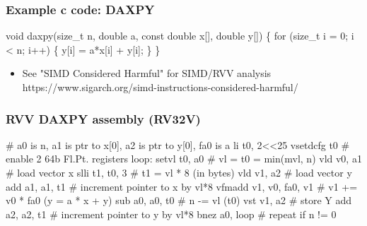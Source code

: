 \documentclass[slidestop]{beamer}
\begin{document}


\begin{frame}[fragile]
\frametitle{Example c code: DAXPY}

\begin{semiverbatim}
    void daxpy(size_t n, double a,
               const double x[], double y[])
    \{
     for (size_t i = 0; i < n; i++) \{
       y[i] = a*x[i] + y[i];
     \}
    \}
\end{semiverbatim}

  \begin{itemize}
   \item See "SIMD Considered Harmful" for SIMD/RVV analysis\\
	   https://www.sigarch.org/simd-instructions-considered-harmful/
  \end{itemize}


\end{frame}


\begin{frame}[fragile]
\frametitle{RVV DAXPY assembly (RV32V)}

\begin{semiverbatim}
# a0 is n, a1 is ptr to x[0], a2 is ptr to y[0], fa0 is a
 li t0, 2<<25
 vsetdcfg t0            # enable 2 64b Fl.Pt. registers
loop:
 setvl  t0, a0          # vl = t0 = min(mvl, n)
 vld    v0, a1          # load vector x
 slli   t1, t0, 3       # t1 = vl * 8 (in bytes)
 vld    v1, a2          # load vector y
 add    a1, a1, t1      # increment pointer to x by vl*8
 vfmadd v1, v0, fa0, v1 # v1 += v0 * fa0 (y = a * x + y)
 sub    a0, a0, t0      # n -= vl (t0)
 vst    v1, a2          # store Y
 add    a2, a2, t1      # increment pointer to y by vl*8
 bnez   a0, loop        # repeat if n != 0
\end{semiverbatim}
\end{frame}
\end{document}
